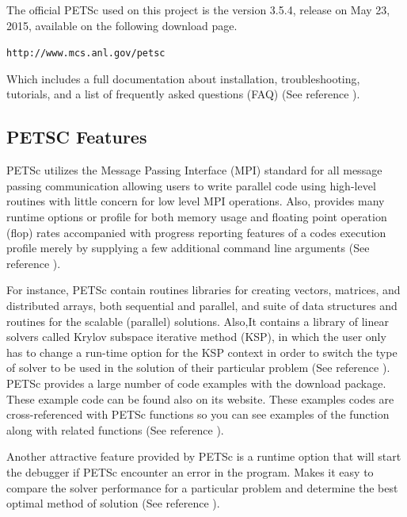\documentclass{article}
\begin{document}
The official PETSc used on this project is the version 3.5.4, release on May 23, 2015, available on the following download page. 
\begin{center}
\verb+http://www.mcs.anl.gov/petsc+
\end{center}
Which includes a full documentation about installation, troubleshooting, tutorials, and a list of frequently asked questions (FAQ) (See reference \cite{petsc_web_page, petsc_user_ref}). 

\subsection{PETSC Features}
PETSc utilizes the Message Passing Interface (MPI) standard for all message passing communication allowing users to write parallel
code using high-level routines with little concern for low level MPI operations. Also, provides many runtime options or profile for both memory usage and floating point operation
(flop) rates accompanied with progress reporting features of a codes execution profile merely by supplying a few additional command line arguments (See reference \cite{petsc_web_page, petsc_user_ref}).

For instance, PETSc contain routines libraries for creating vectors, matrices, and distributed arrays, both sequential and parallel,
and suite of data structures and routines for the scalable (parallel) solutions. Also,It contains a library of linear solvers called Krylov subspace iterative method (KSP),
in which the user only has to change a run-time option for the KSP context in order to switch the type of solver to be used in the solution
of their particular problem (See reference \cite{petsc_web_page, petsc_user_ref}).
PETSc provides a large number of code examples with the download package. These example code can be found also on its website.
These examples codes are cross-referenced with PETSc functions so you can see examples of the function along with related functions (See reference \cite{petsc_web_page, petsc_user_ref}). 

Another attractive feature provided by PETSc is a runtime option that will start the debugger if PETSc encounter an error in the program.
Makes it easy to compare the solver performance for a particular problem and determine the best optimal method of solution (See reference \cite{petsc_web_page, petsc_user_ref}).
\end{document}
